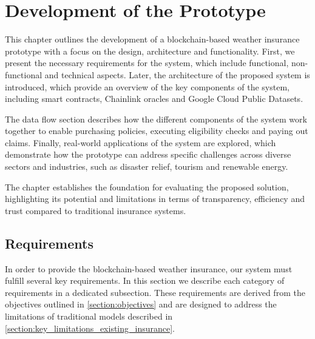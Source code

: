 \chapter{Development of the Prototype}\label{chapter:development_prototype}
This chapter outlines the development of a blockchain-based weather insurance prototype with a focus on the design, architecture and functionality. First, we present the necessary requirements for the system, which include functional, non-functional and technical aspects. Later, the architecture of the proposed system is introduced, which provide an overview of the key components of the system, including smart contracts, Chainlink oracles and Google Cloud Public Datasets.

The data flow section describes how the different components of the system work together to enable purchasing policies, executing eligibility checks and paying out claims. Finally, real-world applications of the system are explored, which demonstrate how the prototype can address specific challenges across diverse sectors and industries, such as disaster relief, tourism and renewable energy.

The chapter establishes the foundation for evaluating the proposed solution, highlighting its potential and limitations in terms of transparency, efficiency and trust compared to traditional insurance systems.

\section{Requirements}\label{section:requirements}
In order to provide the blockchain-based weather insurance, our system must fulfill several key requirements. In this section we describe each category of requirements in a dedicated subsection. These requirements are derived from the objectives outlined in \cref{section:objectives} and are designed to address the limitations of traditional models described in \cref{section:key_limitations_existing_insurance}.

